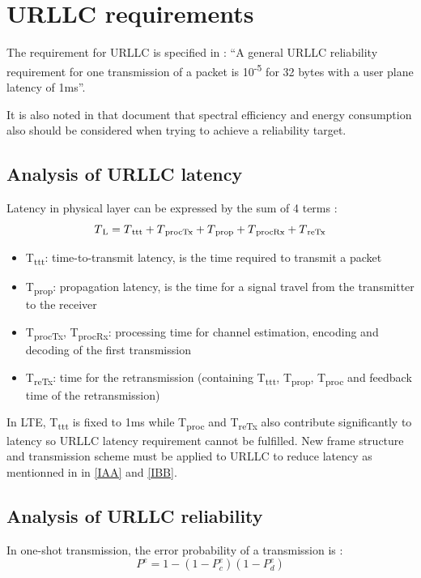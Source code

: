 \documentclass[conference]{IEEEtran}
\begin{document}
\section{URLLC requirements}
The requirement for URLLC is specified in \cite{b6}: ``A general URLLC reliability requirement for one transmission of a packet is 10\textsuperscript{-5} for 32 bytes with a user plane latency of 1ms''.

It is also noted in that document that spectral efficiency and energy consumption also should be considered when trying to achieve a reliability target. 
\subsection{Analysis of URLLC latency}
Latency in physical layer can be expressed by the sum of 4 terms \cite{ad1}:
\begin{equation}
T\textsubscript{L}= T\textsubscript{ttt} + T\textsubscript{procTx} + T\textsubscript{prop} + T\textsubscript{procRx} + T\textsubscript{reTx}\label{eq1}
\end{equation}

\begin{itemize}
\item T\textsubscript{ttt}: time-to-transmit latency, is the time required to transmit a packet
\item T\textsubscript{prop}: propagation latency, is the time for a signal travel from the transmitter to the receiver
\item T\textsubscript{procTx}, T\textsubscript{procRx}: processing time for channel estimation, encoding and decoding of the first transmission
\item T\textsubscript{reTx}: time for the retransmission (containing T\textsubscript{ttt}, T\textsubscript{prop}, T\textsubscript{proc} and feedback time of the retransmission) 
\end{itemize}

In LTE, T\textsubscript{ttt} is fixed to 1ms while T\textsubscript{proc} and T\textsubscript{reTx} also contribute significantly to latency so URLLC latency requirement cannot be fulfilled. New frame structure and transmission scheme must be applied to URLLC to reduce latency as mentionned in in \ref{IAA} and \ref{IBB}.  
\subsection{Analysis of URLLC reliability}\label{IIBB}
In one-shot transmission, the error probability of a transmission is :
\begin{equation}
P^{e} = 1 - (1 - P^{e}_{c})(1 - P^{e}_{d})\label{eq2}
\end{equation}
\end{document}
